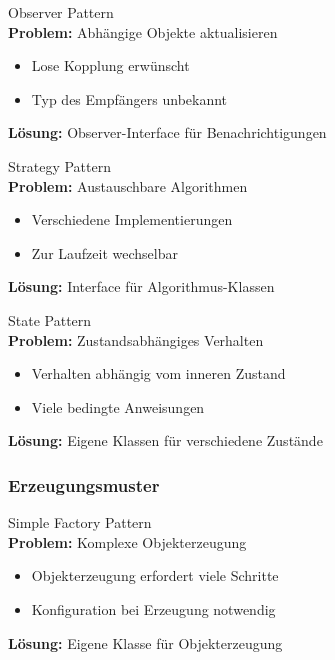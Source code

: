 \begin{definition}{Observer Pattern}\\
\textbf{Problem:} Abhängige Objekte aktualisieren
\begin{itemize}
    \item Lose Kopplung erwünscht
    \item Typ des Empfängers unbekannt
\end{itemize}
\textbf{Lösung:} Observer-Interface für Benachrichtigungen
\end{definition}

\begin{definition}{Strategy Pattern}\\
\textbf{Problem:} Austauschbare Algorithmen
\begin{itemize}
    \item Verschiedene Implementierungen
    \item Zur Laufzeit wechselbar
\end{itemize}
\textbf{Lösung:} Interface für Algorithmus-Klassen
\end{definition}

\begin{definition}{State Pattern}\\
\textbf{Problem:} Zustandsabhängiges Verhalten
\begin{itemize}
    \item Verhalten abhängig vom inneren Zustand
    \item Viele bedingte Anweisungen
\end{itemize}
\textbf{Lösung:} Eigene Klassen für verschiedene Zustände
\end{definition}

\subsubsection{Erzeugungsmuster}

\begin{definition}{Simple Factory Pattern}\\
\textbf{Problem:} Komplexe Objekterzeugung
\begin{itemize}
    \item Objekterzeugung erfordert viele Schritte
    \item Konfiguration bei Erzeugung notwendig
\end{itemize}
\textbf{Lösung:} Eigene Klasse für Objekterzeugung
\end{definition}

